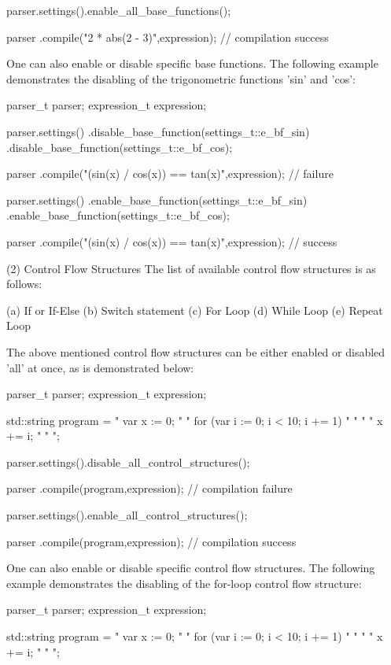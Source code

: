 parser.settings().enable\_all\_base\_functions();

parser
.compile("2 * abs(2 - 3)",expression); // compilation success


One can also enable or disable specific base functions. The  following
example  demonstrates  the disabling  of  the trigonometric  functions
'sin' and 'cos':

parser\_t parser;
expression\_t expression;

parser.settings()
.disable\_base\_function(settings\_t::e\_bf\_sin)
.disable\_base\_function(settings\_t::e\_bf\_cos);

parser
.compile("(sin(x) / cos(x)) == tan(x)",expression); // failure

parser.settings()
.enable\_base\_function(settings\_t::e\_bf\_sin)
.enable\_base\_function(settings\_t::e\_bf\_cos);

parser
.compile("(sin(x) / cos(x)) == tan(x)",expression); // success


(2) Control Flow Structures
The list of available control flow structures is as follows:

(a) If or If-Else
(b) Switch statement
(c) For Loop
(d) While Loop
(e) Repeat Loop


The  above  mentioned  control flow structures  can be  either enabled
or disabled 'all' at once, as is demonstrated below:

parser\_t parser;
expression\_t expression;

std::string program =
" var x := 0;                      "
" for (var i := 0; i < 10; i += 1) "
" {                                "
"   x += i;                        "
" }                                ";

parser.settings().disable\_all\_control\_structures();

parser
.compile(program,expression); // compilation failure

parser.settings().enable\_all\_control\_structures();

parser
.compile(program,expression); // compilation success


One can also enable or  disable specific control flow structures.  The
following example demonstrates the  disabling of the for-loop  control
flow structure:

parser\_t parser;
expression\_t expression;

std::string program =
" var x := 0;                      "
" for (var i := 0; i < 10; i += 1) "
" {                                "
"   x += i;                        "
" }                                ";

